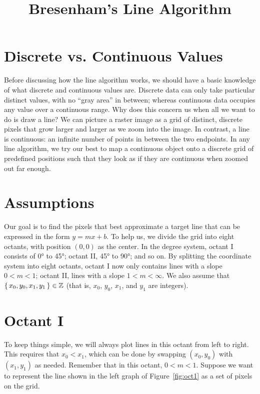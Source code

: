 \documentclass[12pt,letterpaper]{article}
\title{Bresenham's Line Algorithm}
\date{}
\begin{document}
\maketitle

\section{Discrete vs. Continuous Values}
Before discussing how the line algorithm works, we should have a basic knowledge of what discrete and continuous values are.
Discrete data can only take particular distinct values, with no \enquote{gray area} in between; whereas continuous data occupies any value over a continuous range.
Why does this concern us when all we want to do is draw a line?
We can picture a raster image as a grid of distinct, discrete pixels that grow larger and larger as we zoom into the image.
In contrast, a line is continuous: an infinite number of points in between the two endpoints.
In any line algorithm, we try our best to map a continuous object onto a discrete grid of predefined positions such that they look as if they are continuous when zoomed out far enough.

\section{Assumptions}
Our goal is to find the pixels that best approximate a target line that can be expressed in the form $y = mx + b$.
To help us, we divide the grid into eight octants, with position $(0, 0)$ as the center.
In the degree system, octant I consists of \ang{0} to \ang{45}; octant II, \ang{45} to \ang{90}; and so on.
By splitting the coordinate system into eight octants, octant I now only contains lines with a slope $0 < m < 1$; octant II, lines with a slope $1 < m < \infty$.
We also assume that $\set{x_0, y_0, x_1, y_1} \in \mathbb{Z}$ (that is, $x_0$, $y_0$, $x_1$, and $y_1$ are integers).

\section{Octant I}
To keep things simple, we will always plot lines in this octant from left to right.
This requires that $x_0 < x_1$, which can be done by swapping $(x_0, y_0)$ with $(x_1, y_1)$ as needed.
Remember that in this octant, $0 < m < 1$.
Suppose we want to represent the line shown in the left graph of Figure~\ref{fig:oct1} as a set of pixels on the grid.
\end{document}

